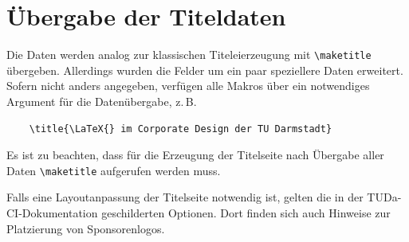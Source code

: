 \documentclass[
	german,%
	accentcolor=9c,%
	ruledheaders=section,%
	class=report,%
	thesis={type=bachelor},%
	fontsize=11pt,%
	parskip=half-,%
	custommargins=true,%
	marginpar=false,%
]{tudapub}
\begin{document}
\section{Übergabe der Titeldaten}

Die Daten werden analog zur klassischen Titeleierzeugung mit \verb+\maketitle+ übergeben. Allerdings wurden die Felder um ein paar speziellere Daten erweitert. Sofern nicht anders angegeben, verfügen alle Makros über ein notwendiges Argument für die Datenübergabe, z.\,B.
\begin{verbatim}
    \title{\LaTeX{} im Corporate Design der TU Darmstadt}
\end{verbatim}
Es ist zu beachten, dass für die Erzeugung der Titelseite nach Übergabe aller Daten \verb+\maketitle+ aufgerufen werden muss.

Falls eine Layoutanpassung der Titelseite notwendig ist, gelten die in der TUDa-CI-Dokumentation \cite{tuda-ci}  geschilderten Optionen. Dort finden sich auch Hinweise zur Platzierung von Sponsorenlogos.
\end{document}
